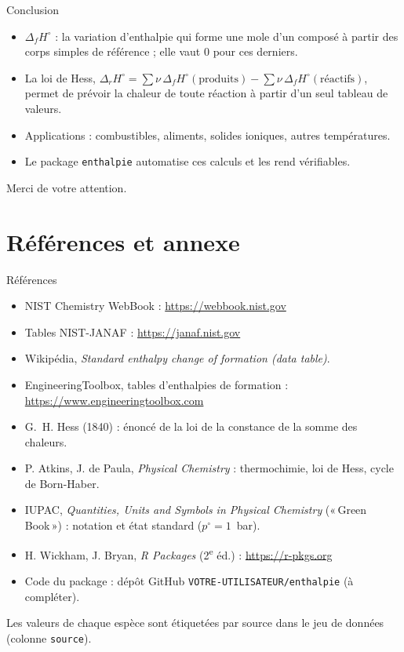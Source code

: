 \documentclass[aspectratio=169,10pt]{beamer}
\newcommand{\dfH}{\Delta_{f}H^{\circ}}
\newcommand{\drH}{\Delta_{r}H^{\circ}}
\newcommand{\guil}[1]{«\,#1\,»}
\begin{document}
\begin{frame}{Conclusion}
  \begin{itemize}
    \item $\dfH$ : la variation d'enthalpie qui forme une mole d'un composé à
      partir des corps simples de référence ; elle vaut $0$ pour ces derniers.
    \item La loi de Hess, $\drH = \sum \nu\,\dfH(\text{produits}) - \sum \nu\,\dfH(\text{réactifs})$,
      permet de prévoir la chaleur de toute réaction à partir d'un seul
      tableau de valeurs.
    \item Applications : combustibles, aliments, solides ioniques, autres
      températures.
    \item Le package \texttt{enthalpie} automatise ces calculs et les rend
      vérifiables.
  \end{itemize}
  \vspace{4mm}
  \centering\Large Merci de votre attention.
\end{frame}

\section*{Références et annexe}

\begin{frame}{Références}
  \footnotesize
  \begin{itemize}
    \item NIST Chemistry WebBook : \url{https://webbook.nist.gov}
    \item Tables NIST-JANAF : \url{https://janaf.nist.gov}
    \item Wikipédia, \emph{Standard enthalpy change of formation (data table)}.
    \item EngineeringToolbox, tables d'enthalpies de formation :
      \url{https://www.engineeringtoolbox.com}
    \item G.~H. Hess (1840) : énoncé de la loi de la constance de la somme des
      chaleurs.
    \item P. Atkins, J. de Paula, \emph{Physical Chemistry} : thermochimie,
      loi de Hess, cycle de Born-Haber.
    \item IUPAC, \emph{Quantities, Units and Symbols in Physical Chemistry}
      (\guil{Green Book}) : notation et état standard ($p^{\circ} = 1$~bar).
    \item H. Wickham, J. Bryan, \emph{R Packages} (2\textsuperscript{e} éd.) :
      \url{https://r-pkgs.org}
    \item Code du package : dépôt GitHub \texttt{VOTRE-UTILISATEUR/enthalpie}
      (à compléter).
  \end{itemize}
  \vspace{2mm}
  Les valeurs de chaque espèce sont étiquetées par source dans le jeu de
  données (colonne \texttt{source}).
\end{frame}
\end{document}
